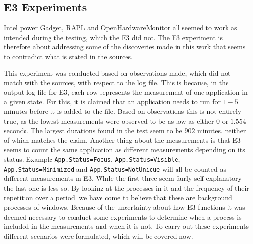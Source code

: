 \subsection{E3 Experiments}

Intel power Gadget, RAPL and OpenHardwareMonitor all seemed to work as intended during the testing, which the E3 did not. The E3 experiment is therefore about addressing some of the discoveries made in this work that seems to contradict what is stated in the sources\cite[]{E3Doc,E3Video,E3WinHec}. 

This experiment was conducted based on observations made, which did not match with the sources, with respect to the log file. This is because, in the output log file for E3, each row represents the measurement of one application in a given state. For this, it is claimed that an application needs to run for $1-5$ minutes before it is added to the file. Based on observations this is not entirely true, as the lowest measurements were observed to be as low as either $0$ or $1.554$ seconds. The largest durations found in the test seem to be $902$ minutes, neither of which matches the claim. Another thing about the measurements is that E3 seems to count the same application as different measurements depending on its status.
Example \texttt{App.Status=Focus}, \texttt{App.Status=Visible}, \texttt{App.Status=Minimized} and \texttt{App.Status=NotUnique} will all be counted as different measurements in E3. While the first three seem fairly self-explanatory the last one is less so. By looking at the processes in it and the frequency of their repetition over a period, we have come to believe that these are background processes of windows. 
Because of the uncertainty about how E3 functions it was deemed necessary to conduct some experiments to determine when a process is included in the measurements and when it is not. To carry out these experiments different scenarios were formulated, which will be covered now.

